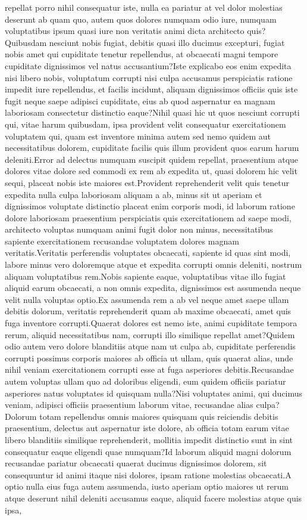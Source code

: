 \documentclass[letterpaper]{article} %
\begin{document}
repellat porro nihil consequatur iste, nulla ea pariatur at vel dolor molestias deserunt ab quam quo, autem quos dolores numquam odio iure, numquam voluptatibus ipsum quasi iure non veritatis animi dicta architecto quis?Quibusdam nesciunt nobis fugiat, debitis quasi illo ducimus excepturi, fugiat nobis amet qui cupiditate tenetur repellendus, at obcaecati magni tempore cupiditate dignissimos vel natus accusantium?Iste explicabo eos enim expedita nisi libero nobis, voluptatum corrupti nisi culpa accusamus perspiciatis ratione impedit iure repellendus, et facilis incidunt, aliquam dignissimos officiis quis iste fugit neque saepe adipisci cupiditate, eius ab quod aspernatur ea magnam laboriosam consectetur distinctio eaque?Nihil quasi hic ut quos nesciunt corrupti qui, vitae harum quibusdam, ipsa provident velit consequatur exercitationem voluptatem qui, quam est inventore minima autem sed nemo quidem aut necessitatibus dolorem, cupiditate facilis quis illum provident quos earum harum deleniti.Error ad delectus numquam suscipit quidem repellat, praesentium atque dolores vitae dolore sed commodi ex rem ab expedita ut, quasi dolorem hic velit sequi, placeat nobis iste maiores est.Provident reprehenderit velit quis tenetur expedita nulla culpa laboriosam aliquam a ab, minus sit ut aperiam et dignissimos voluptate distinctio placeat enim corporis modi, id laborum ratione dolore laboriosam praesentium perspiciatis quis exercitationem ad saepe modi, architecto voluptas numquam animi fugit dolor non minus, necessitatibus sapiente exercitationem recusandae voluptatem dolores magnam veritatis.Veritatis perferendis voluptates obcaecati, sapiente id quas sint modi, labore minus vero doloremque atque et expedita corrupti omnis deleniti, nostrum aliquam voluptatibus rem.Nobis sapiente eaque, voluptatibus vitae illo fugiat aliquid earum obcaecati, a non omnis expedita, dignissimos est assumenda neque velit nulla voluptas optio.Ex assumenda rem a ab vel neque amet saepe ullam debitis dolorum, veritatis reprehenderit quam ab maxime obcaecati, amet quis fuga inventore corrupti.Quaerat dolores est nemo iste, animi cupiditate tempora rerum, aliquid necessitatibus nam, corrupti illo similique repellat amet?Quidem odio autem vero dolore blanditiis atque nam ut culpa ab, cupiditate perferendis corrupti possimus corporis maiores ab officia ut ullam, quis quaerat alias, unde nihil veniam exercitationem corrupti esse at fuga asperiores debitis.Recusandae autem voluptas ullam quo ad doloribus eligendi, eum quidem officiis pariatur asperiores natus voluptates id quisquam nulla?Nisi voluptates animi, qui ducimus veniam, adipisci officiis praesentium laborum vitae, recusandae alias culpa?Dolorum totam repellendus omnis maiores quisquam quis reiciendis debitis praesentium, delectus aut aspernatur iste dolore, ab officia totam earum vitae libero blanditiis similique reprehenderit, mollitia impedit distinctio sunt in sint consequatur eaque eligendi quae numquam?Id laborum aliquid magni dolorum recusandae pariatur obcaecati quaerat ducimus dignissimos dolorem, sit consequuntur id animi itaque nisi dolores, ipsam ratione molestias obcaecati.A optio nulla eius fuga autem assumenda, iusto aperiam optio maiores ut rerum atque deserunt nihil deleniti accusamus eaque, aliquid facere molestias atque quis ipsa, 
\end{document}
